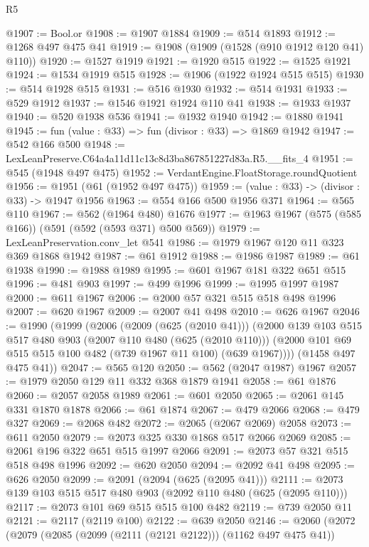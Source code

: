 \begin{lexlean}{R5}
\begin{coremodule}
@1907 := Bool.or
@1908 := @1907 @1884
@1909 := @514 @1893
@1912 := @1268 @497 @475 @41
@1919 := @1908 (@1909 (@1528 (@910 @1912 @120 @41) @110))
@1920 := @1527 @1919
@1921 := @1920 @515
@1922 := @1525 @1921
@1924 := @1534 @1919 @515
@1928 := @1906 (@1922 @1924 @515 @515)
@1930 := @514 @1928 @515
@1931 := @516 @1930
@1932 := @514 @1931
@1933 := @529 @1912
@1937 := @1546 @1921 @1924 @110 @41
@1938 := @1933 @1937
@1940 := @520 @1938 @536
@1941 := @1932 @1940
@1942 := @1880 @1941
@1945 := fun (value : @33) => fun (divisor : @33) => @1869 @1942
@1947 := @542 @166 @500
@1948 := LexLeanPreserve.C64a4a11d11c13c8d3ba867851227d83a.R5.__fits_4
@1951 := @545 (@1948 @497 @475)
@1952 := VerdantEngine.FloatStorage.roundQuotient
@1956 := @1951 (@61 (@1952 @497 @475))
@1959 := (value : @33) -> (divisor : @33) -> @1947 @1956
@1963 := @554 @166 @500 @1956 @371
@1964 := @565 @110
@1967 := @562 (@1964 @480) @1676
@1977 := @1963 @1967 (@575 (@585 @166)) (@591 (@592 (@593 @371) @500 @569))
@1979 := LexLeanPreservation.conv_let @541
@1986 := @1979 @1967 @120 @11 @323 @369 @1868 @1942
@1987 := @61 @1912
@1988 := @1986 @1987
@1989 := @61 @1938
@1990 := @1988 @1989
@1995 := @601 @1967 @181 @322 @651 @515
@1996 := @481 @903
@1997 := @499 @1996
@1999 := @1995 @1997 @1987
@2000 := @611 @1967
@2006 := @2000 @57 @321 @515 @518 @498 @1996
@2007 := @620 @1967
@2009 := @2007 @41 @498
@2010 := @626 @1967
@2046 := @1990
    (@1999
      (@2006
        (@2009 (@625 (@2010 @41)))
        (@2000
          @139
          @103
          @515
          @517
          @480
          @903
          (@2007 @110 @480 (@625 (@2010 @110)))
          (@2000 @101 @69 @515 @515 @100 @482 (@739 @1967 @11 @100) (@639 @1967))))
      (@1458 @497 @475 @41))
@2047 := @565 @120
@2050 := @562 (@2047 @1987) @1967
@2057 := @1979 @2050 @129 @11 @332 @368 @1879 @1941
@2058 := @61 @1876
@2060 := @2057 @2058 @1989
@2061 := @601 @2050
@2065 := @2061 @145 @331 @1870 @1878
@2066 := @61 @1874
@2067 := @479 @2066
@2068 := @479 @327
@2069 := @2068 @482
@2072 := @2065 (@2067 @2069) @2058
@2073 := @611 @2050
@2079 := @2073 @325 @330 @1868 @517 @2066 @2069
@2085 := @2061 @196 @322 @651 @515 @1997 @2066
@2091 := @2073 @57 @321 @515 @518 @498 @1996
@2092 := @620 @2050
@2094 := @2092 @41 @498
@2095 := @626 @2050
@2099 := @2091 (@2094 (@625 (@2095 @41)))
@2111 := @2073 @139 @103 @515 @517 @480 @903 (@2092 @110 @480 (@625 (@2095 @110)))
@2117 := @2073 @101 @69 @515 @515 @100 @482
@2119 := @739 @2050 @11
@2121 := @2117 (@2119 @100)
@2122 := @639 @2050
@2146 := @2060
    (@2072
      (@2079
        (@2085 (@2099 (@2111 (@2121 @2122))) (@1162 @497 @475 @41))

\end{coremodule}
\end{lexlean}
